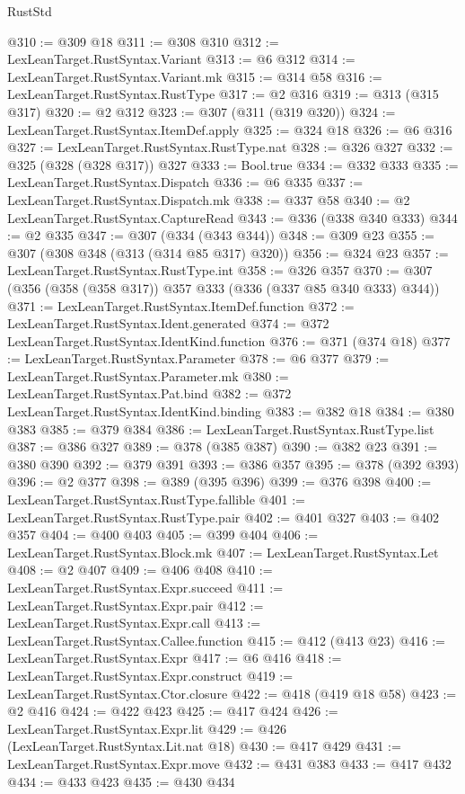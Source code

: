 \begin{lexlean}{RustStd}
\begin{coremodule}
{\begin{coremodule}
{{{{{{{{{{{@310 := @309 @18
@311 := @308 @310
@312 := LexLeanTarget.RustSyntax.Variant
@313 := @6 @312
@314 := LexLeanTarget.RustSyntax.Variant.mk
@315 := @314 @58
@316 := LexLeanTarget.RustSyntax.RustType
@317 := @2 @316
@319 := @313 (@315 @317)
@320 := @2 @312
@323 := @307 (@311 (@319 @320))
@324 := LexLeanTarget.RustSyntax.ItemDef.apply
@325 := @324 @18
@326 := @6 @316
@327 := LexLeanTarget.RustSyntax.RustType.nat
@328 := @326 @327
@332 := @325 (@328 (@328 @317)) @327
@333 := Bool.true
@334 := @332 @333
@335 := LexLeanTarget.RustSyntax.Dispatch
@336 := @6 @335
@337 := LexLeanTarget.RustSyntax.Dispatch.mk
@338 := @337 @58
@340 := @2 LexLeanTarget.RustSyntax.CaptureRead
@343 := @336 (@338 @340 @333)
@344 := @2 @335
@347 := @307 (@334 (@343 @344))
@348 := @309 @23
@355 := @307 (@308 @348 (@313 (@314 @85 @317) @320))
@356 := @324 @23
@357 := LexLeanTarget.RustSyntax.RustType.int
@358 := @326 @357
@370 := @307 (@356 (@358 (@358 @317)) @357 @333 (@336 (@337 @85 @340 @333) @344))
@371 := LexLeanTarget.RustSyntax.ItemDef.function
@372 := LexLeanTarget.RustSyntax.Ident.generated
@374 := @372 LexLeanTarget.RustSyntax.IdentKind.function
@376 := @371 (@374 @18)
@377 := LexLeanTarget.RustSyntax.Parameter
@378 := @6 @377
@379 := LexLeanTarget.RustSyntax.Parameter.mk
@380 := LexLeanTarget.RustSyntax.Pat.bind
@382 := @372 LexLeanTarget.RustSyntax.IdentKind.binding
@383 := @382 @18
@384 := @380 @383
@385 := @379 @384
@386 := LexLeanTarget.RustSyntax.RustType.list
@387 := @386 @327
@389 := @378 (@385 @387)
@390 := @382 @23
@391 := @380 @390
@392 := @379 @391
@393 := @386 @357
@395 := @378 (@392 @393)
@396 := @2 @377
@398 := @389 (@395 @396)
@399 := @376 @398
@400 := LexLeanTarget.RustSyntax.RustType.fallible
@401 := LexLeanTarget.RustSyntax.RustType.pair
@402 := @401 @327
@403 := @402 @357
@404 := @400 @403
@405 := @399 @404
@406 := LexLeanTarget.RustSyntax.Block.mk
@407 := LexLeanTarget.RustSyntax.Let
@408 := @2 @407
@409 := @406 @408
@410 := LexLeanTarget.RustSyntax.Expr.succeed
@411 := LexLeanTarget.RustSyntax.Expr.pair
@412 := LexLeanTarget.RustSyntax.Expr.call
@413 := LexLeanTarget.RustSyntax.Callee.function
@415 := @412 (@413 @23)
@416 := LexLeanTarget.RustSyntax.Expr
@417 := @6 @416
@418 := LexLeanTarget.RustSyntax.Expr.construct
@419 := LexLeanTarget.RustSyntax.Ctor.closure
@422 := @418 (@419 @18 @58)
@423 := @2 @416
@424 := @422 @423
@425 := @417 @424
@426 := LexLeanTarget.RustSyntax.Expr.lit
@429 := @426 (LexLeanTarget.RustSyntax.Lit.nat @18)
@430 := @417 @429
@431 := LexLeanTarget.RustSyntax.Expr.move
@432 := @431 @383
@433 := @417 @432
@434 := @433 @423
@435 := @430 @434
}}}}}}}}}}}
\end{coremodule}}
\end{coremodule}
\end{lexlean}
